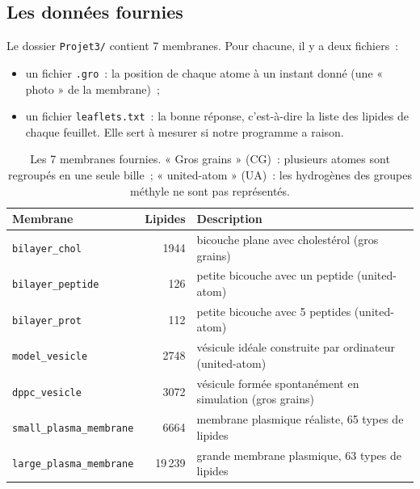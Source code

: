 \documentclass[11pt,a4paper]{article}
\newcommand{\f}[1]{\texttt{#1}}
\begin{document}
\subsection{Les données fournies}
Le dossier \f{Projet3/} contient 7 membranes. Pour chacune, il y a deux fichiers~:
\begin{itemize}
\item un fichier \f{.gro}~: la position de chaque atome à un instant donné (une « photo » de la membrane)~;
\item un fichier \f{leaflets.txt}~: la bonne réponse, c'est-à-dire la liste des lipides de chaque feuillet.
Elle sert à mesurer si notre programme a raison.
\end{itemize}

\begin{table}[H]\centering\small
\begin{tabular}{|l|r|l|}\hline
Membrane & Lipides & Description\\\hline
\f{bilayer\_chol} & 1944 & bicouche plane avec cholestérol (gros grains)\\\hline
\f{bilayer\_peptide} & 126 & petite bicouche avec un peptide (united-atom)\\\hline
\f{bilayer\_prot} & 112 & petite bicouche avec 5 peptides (united-atom)\\\hline
\f{model\_vesicle} & 2748 & vésicule idéale construite par ordinateur (united-atom)\\\hline
\f{dppc\_vesicle} & 3072 & vésicule formée spontanément en simulation (gros grains)\\\hline
\f{small\_plasma\_membrane} & 6664 & membrane plasmique réaliste, 65 types de lipides\\\hline
\f{large\_plasma\_membrane} & 19\,239 & grande membrane plasmique, 63 types de lipides\\\hline
\end{tabular}
\caption{Les 7 membranes fournies. « Gros grains » (CG)~: plusieurs atomes sont regroupés en une seule bille~;
« united-atom » (UA)~: les hydrogènes des groupes méthyle ne sont pas représentés.}
\end{table}
\end{document}
